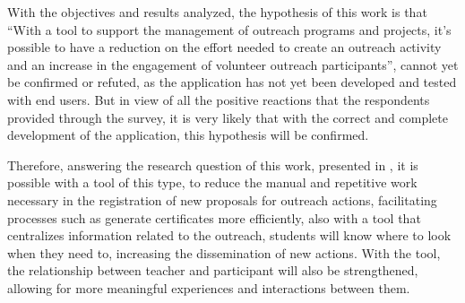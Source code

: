 With the objectives and results analyzed, the hypothesis of this work is that ``With a tool to support the management of outreach programs and projects, it's possible to have a reduction on the effort needed to create an outreach activity and an increase in the engagement of volunteer outreach participants'', cannot yet be confirmed or refuted, as the application has not yet been developed and tested with end users. 
But in view of all the positive reactions that the respondents provided through the survey, it is very likely that with the correct and complete development of the application, this hypothesis will be confirmed.


Therefore, answering the research question of this work, presented in , it is possible with a tool of this type, to reduce the manual and repetitive work necessary in the registration of new proposals for outreach actions, facilitating processes such as generate certificates more efficiently, also with a tool that centralizes information related to the outreach, students will know where to look when they need to, increasing the dissemination of new actions. 
With the tool, the relationship between teacher and participant will also be strengthened, allowing for more meaningful experiences and interactions between them.


